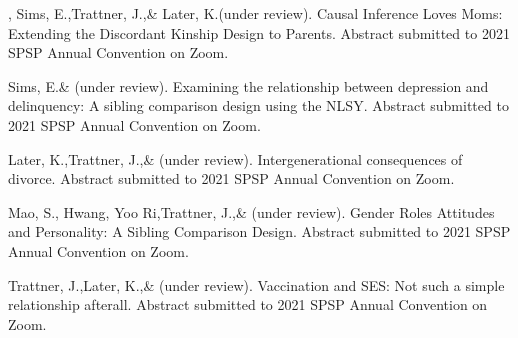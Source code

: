 \item \meb, Sims, E.,\notb Trattner, J.,\nota \& Later, K.\notans (under review). Causal Inference Loves Moms: Extending the Discordant Kinship Design to Parents. Abstract submitted to 2021 SPSP Annual Convention on Zoom.
%
\item Sims, E.\notbns \& \meb (under review). Examining the relationship between depression and delinquency: A sibling comparison design using the NLSY. Abstract submitted to 2021 SPSP Annual Convention on Zoom.
%
\item Later, K.,\nota Trattner, J.,\nota \& \meb (under review). Intergenerational consequences of divorce. Abstract submitted to 2021 SPSP Annual Convention on Zoom.
%
\item Mao, S.\nota, Hwang, Yoo Ri,\notb Trattner, J.,\nota \& \meb (under review). Gender Roles Attitudes and Personality: A Sibling Comparison Design.  Abstract submitted to 2021 SPSP Annual Convention on Zoom.
%
\item Trattner, J.,\nota Later, K.,\nota \& \meb (under review). Vaccination and SES: Not such a simple relationship afterall. Abstract submitted to 2021 SPSP Annual Convention on Zoom.